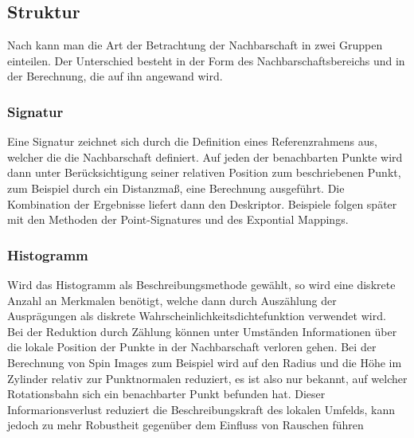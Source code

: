 \documentclass[12pt]{article}
\begin{document}
\subsection{Struktur}



Nach \cite{SD} kann man die Art der Betrachtung der Nachbarschaft in zwei Gruppen einteilen. Der Unterschied besteht in der Form des Nachbarschaftsbereichs und in der Berechnung, die auf ihn angewand wird.
\subsubsection{Signatur} Eine Signatur zeichnet sich durch die Definition eines Referenzrahmens aus, welcher die die Nachbarschaft definiert. Auf jeden der benachbarten Punkte wird dann unter Berücksichtigung seiner relativen Position zum beschriebenen Punkt, zum Beispiel durch ein Distanzmaß, eine Berechnung ausgeführt. Die Kombination der Ergebnisse liefert dann den Deskriptor. Beispiele folgen später mit den Methoden der Point-Signatures und des Expontial Mappings.



\subsubsection{Histogramm}
Wird das Histogramm als Beschreibungsmethode gewählt, so wird eine diskrete Anzahl an Merkmalen benötigt, welche dann durch Auszählung der Ausprägungen als diskrete Wahrscheinlichkeitsdichtefunktion verwendet wird. \\

Bei der Reduktion durch Zählung können unter Umständen Informationen über die lokale Position der Punkte in der Nachbarschaft verloren gehen. Bei der Berechnung von Spin Images \cite{SpinImage} zum Beispiel wird auf den Radius und die Höhe im Zylinder relativ zur Punktnormalen reduziert, es ist also nur bekannt, auf welcher Rotationsbahn sich ein benachbarter Punkt befunden hat. Dieser Informarionsverlust reduziert die Beschreibungskraft des lokalen Umfelds, kann jedoch zu mehr Robustheit gegenüber dem Einfluss von Rauschen führen \cite{SD}\\
\end{document}
